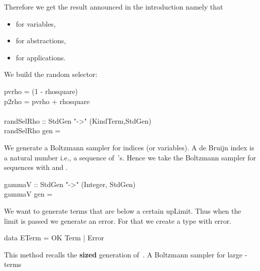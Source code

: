 \documentclass{sig-alternate}
\begin{document}
\begin{figure*}[!t]
Therefore we get the result announced in the introduction namely that
\begin{itemize}
\item  for variables,
\item  for abstractions,
\item  for applications.
\end{itemize}
We build the random selector:
\begin{haskell}
  \hspace*{-10pt}pvrho = (1 - rhosquare)\\
  \hspace*{-10pt}p2rho = pvrho + rhosquare\\
  ~\\
  \hspace*{-10pt}randSelRho :: StdGen "->" (KindTerm,StdGen)\\
  \hspace*{-10pt}randSelRho gen = 
\end{haskell}
We generate a Boltzmann sampler for indices (or variables).  A de Bruijn index is a
natural number i.e.,  a sequence of~'s.  Hence we take the Boltzmann sampler for
sequences with  and .
\begin{haskell}
  gammaV :: StdGen "->" (Integer, StdGen)\\
  gammaV gen = 
\end{haskell}
We want to generate terms that are below a certain \<upLimit\>.  Thus when the limit
is passed we generate an error.
For that we create a
type with error.
\begin{haskell}
  data ETerm = OK Term | Error
\end{haskell}
This method recalls the \textbf{sized} generation
of~\cite{DBLP:conf/icfp/ClaessenH00}. \ifICFP A Boltzmann sampler for large -terms

\end{figure*}
\end{document}
